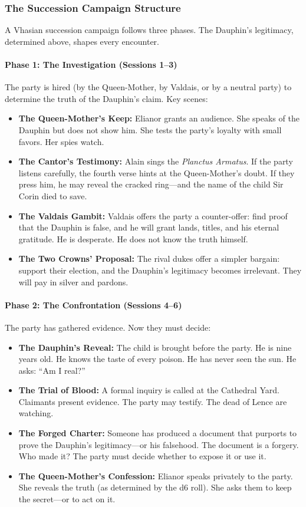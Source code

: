 \subsubsection*{The Succession Campaign Structure}

A Vhasian succession campaign follows three phases. The Dauphin's legitimacy, determined above, shapes every encounter.

\paragraph{Phase 1: The Investigation (Sessions 1--3)}
The party is hired (by the Queen-Mother, by Valdais, or by a neutral party) to determine the truth of the Dauphin's claim. Key scenes:

\begin{itemize}
  \item \textbf{The Queen-Mother's Keep:} Elianor grants an audience. She speaks of the Dauphin but does not show him. She tests the party's loyalty with small favors. Her spies watch.
  \item \textbf{The Cantor's Testimony:} Alain sings the \textit{Planctus Armatus}. If the party listens carefully, the fourth verse hints at the Queen-Mother's doubt. If they press him, he may reveal the cracked ring---and the name of the child Sir Corin died to save.
  \item \textbf{The Valdais Gambit:} Valdais offers the party a counter-offer: find proof that the Dauphin is false, and he will grant lands, titles, and his eternal gratitude. He is desperate. He does not know the truth himself.
  \item \textbf{The Two Crowns' Proposal:} The rival dukes offer a simpler bargain: support their election, and the Dauphin's legitimacy becomes irrelevant. They will pay in silver and pardons.
\end{itemize}

\paragraph{Phase 2: The Confrontation (Sessions 4--6)}
The party has gathered evidence. Now they must decide:

\begin{itemize}
  \item \textbf{The Dauphin's Reveal:} The child is brought before the party. He is nine years old. He knows the taste of every poison. He has never seen the sun. He asks: ``Am I real?''
  \item \textbf{The Trial of Blood:} A formal inquiry is called at the Cathedral Yard. Claimants present evidence. The party may testify. The dead of Lence are watching.
  \item \textbf{The Forged Charter:} Someone has produced a document that purports to prove the Dauphin's legitimacy---or his falsehood. The document is a forgery. Who made it? The party must decide whether to expose it or use it.
  \item \textbf{The Queen-Mother's Confession:} Elianor speaks privately to the party. She reveals the truth (as determined by the d6 roll). She asks them to keep the secret---or to act on it.
\end{itemize}

